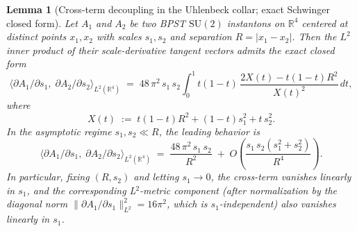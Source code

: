 \documentclass[11pt,letterpaper]{article}
\newtheorem{lemma}[theorem]{Lemma}
\theoremstyle{definition}
\newcommand{\bbR}{\mathbb{R}}
\begin{document}
\begin{lemma}[Cross-term decoupling in the Uhlenbeck collar; exact Schwinger closed form]\label{lem:cross-term}
Let $A_1$ and $A_2$ be two BPST $\mathrm{SU}(2)$ instantons on $\bbR^4$ centered at distinct points $x_1, x_2$ with scales $s_1, s_2$ and separation $R = |x_1 - x_2|$. Then the $L^2$ inner product of their scale-derivative tangent vectors admits the exact closed form
\begin{equation}\label{eq:lemma-cross-term-exact}
\langle \partial A_1/\partial s_1,\;\partial A_2/\partial s_2 \rangle_{L^2(\bbR^4)}
\;=\; 48\,\pi^2\,s_1\,s_2\int_0^1 t(1-t)\,\frac{2X(t) - t(1-t)R^2}{X(t)^2}\,dt,
\end{equation}
where
\begin{equation}\label{eq:lemma-X-def}
X(t) \;:=\; t(1-t)R^2 + (1-t)s_1^2 + t\,s_2^2.
\end{equation}
In the asymptotic regime $s_1, s_2 \ll R$, the leading behavior is
\begin{equation}\label{eq:lemma-asymptotic}
\langle \partial A_1/\partial s_1,\;\partial A_2/\partial s_2 \rangle_{L^2(\bbR^4)}
\;=\; \frac{48\,\pi^2\,s_1\,s_2}{R^2} \;+\; O\!\left(\frac{s_1\,s_2(s_1^2+s_2^2)}{R^4}\right).
\end{equation}
In particular, fixing $(R, s_2)$ and letting $s_1 \to 0$, the cross-term vanishes \emph{linearly} in $s_1$, and the corresponding L${}^2$-metric component (after normalization by the diagonal norm $\|\partial A_1/\partial s_1\|^2_{L^2} = 16\pi^2$, which is $s_1$-independent) also vanishes linearly in $s_1$.
\end{lemma}
\end{document}
